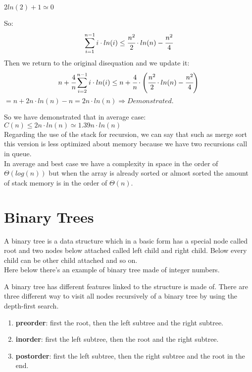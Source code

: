 \documentclass{article}
\begin{document}
\begin{large}
$2ln(2) + 1 \simeq 0$

So:\\
$$\sum_{i=1}^{n-1} i \cdot ln(i) \leq \cfrac{n^2}{2}\cdot ln(n) - \cfrac{n^2}{4}$$
Then we return to the original disequation and we update it:\\
$$ n + \cfrac{4}{n} \sum_{i=2}^{n-1} i \cdot ln(i) \leq n + \cfrac{4}{n} \cdot \left(\cfrac{n^2}{2}\cdot ln(n) - \cfrac{n^2}{4} \right)$$
$= n + 2n\cdot ln(n) -n = 2n\cdot ln(n) \Rightarrow Demonstrated.$

So we have demonstrated that in average case: \\ 
$C(n) \leq 2n\cdot ln(n) \simeq 1.39n\cdot ln(n)$\\

Regarding the use of the stack for recursion, we can say that such as merge sort this version is less optimized about memory because we have two recursions call in queue.\\
In average and best case we have a complexity in space in the order of $\Theta(log(n))$ but when the array is already sorted or almost sorted the amount of stack memory is in the order of $\Theta(n)$.
\end{large}
\section{Binary Trees}
A binary tree is a data structure which in a basic form has a special node called root and two nodes below attached called left child and right child. Below every child can be other child attached and so on. \\
Here below there's an example of binary tree made of integer numbers.


A binary tree has different features linked to the structure is made of. There are three different way to visit all nodes recursively of a binary tree by using the depth-first search. \\
\begin{enumerate}
\item \textbf{preorder}: first the root, then the left subtree and the right subtree.
\item \textbf{inorder}: first the left subtree, then the root and the right subtree.
\item \textbf{postorder}: first the left subtree, then the right subtree and the root in the end.
\end{enumerate}
\end{document}
